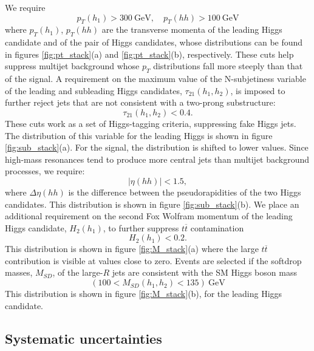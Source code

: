 We require
\begin{equation}
	p_T(h_1)>300~\text{GeV}, \quad p_T(hh)>100 ~\text{GeV}
\end{equation}
where $p_T(h_1)$, $p_T(hh)$ are the transverse momenta of the leading Higgs candidate and of the pair of Higgs candidates, whose distributions can be found in figures \ref{fig:pt_stack}(a) and \ref{fig:pt_stack}(b), respectively.
These cuts help suppress multijet background whose $p_T$ distributions fall more steeply than that of the signal. A requirement on the maximum value of the N-subjetiness variable \cite{Nsubjetiness} of the leading and subleading Higgs candidates, $\tau_{21}(h_1,h_2)$, is imposed to further reject jets that are not consistent with a two-prong substructure:
\begin{equation}
	\tau_{21}(h_1,h_2)<0.4.
\end{equation}
These cuts work as a set of Higgs-tagging criteria, suppressing fake Higgs jets. The distribution of this variable for the leading Higgs is shown in figure \ref{fig:sub_stack}(a). For the signal, the distribution is shifted to lower values.
Since high-mass resonances tend to produce more central jets than multijet background processes, we require:
\begin{equation}
	|\eta(hh)|<1.5,
\end{equation}
where $\Delta\eta(hh)$ is the difference between the pseudorapidities of the two Higgs candidates. This distribution is shown in figure \ref{fig:sub_stack}(b).
We place an additional requirement on the second Fox Wolfram momentum \cite{FW2} of the leading Higgs candidate, $H_2(h_1)$, to further suppress $t\overline{t}$ contamination
\begin{equation}
	H_2(h_1)<0.2.
\end{equation}
This distribution is shown in figure \ref{fig:M_stack}(a) where the large $t\overline{t}$ contribution is visible at values close to zero. 
Events are selected if the softdrop masses, $M_{SD}$, of the large-$R$ jets are consistent with the SM Higgs boson mass
\begin{equation}
	(100<M_{SD}(h_1,h_2)<135) ~\text{GeV}
\end{equation}
This distribution is shown in figure \ref{fig:M_stack}(b), for the leading Higgs candidate. 

\subsection{Systematic uncertainties}

